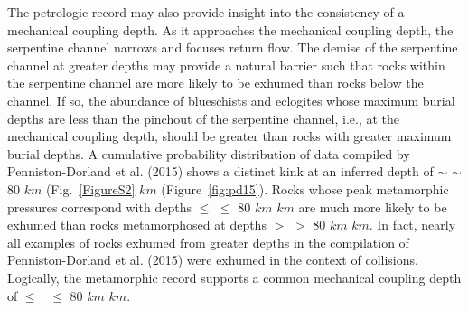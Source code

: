 \documentclass[draft,linenumbers]{agujournal2018} %
\providecommand{\DIFaddtex}[1]{{\protect\color{blue} \sf #1}} %
\providecommand{\DIFdeltex}[1]{{\protect\color{red} \scriptsize #1}} %
\providecommand{\DIFaddbegin}{} %
\providecommand{\DIFaddend}{} %
\providecommand{\DIFdelbegin}{} %
\providecommand{\DIFdelend}{} %
\providecommand{\DIFadd}[1]{\texorpdfstring{\DIFaddtex{#1}}{#1}} %
\providecommand{\DIFdel}[1]{\texorpdfstring{\DIFdeltex{#1}}{}} %
\newcommand{\DIFscaledelfig}{0.3}
\newlength{\DIFdelgraphicswidth} %
\newlength{\DIFdelgraphicsheight} %
\newcommand{\DIFaddincludegraphics}[2][]{{\color{blue}\fbox{\DIFOincludegraphics[#1]{#2}}}} %
\newcommand{\DIFdelincludegraphics}[2][]{%
\sbox{\DIFdelgraphicsbox}{\DIFOincludegraphics[#1]{#2}}%
\settoboxwidth{\DIFdelgraphicswidth}{\DIFdelgraphicsbox} %
\settoboxtotalheight{\DIFdelgraphicsheight}{\DIFdelgraphicsbox} %
\scalebox{\DIFscaledelfig}{%
\parbox[b]{\DIFdelgraphicswidth}{\usebox{\DIFdelgraphicsbox}\\[-\baselineskip] \rule{\DIFdelgraphicswidth}{0em}}\llap{\resizebox{\DIFdelgraphicswidth}{\DIFdelgraphicsheight}{%
\setlength{\unitlength}{\DIFdelgraphicswidth}%
\begin{picture}(1,1)%
\thicklines\linethickness{2pt} %
{\color[rgb]{1,0,0}\put(0,0){\framebox(1,1){}}}%
{\color[rgb]{1,0,0}\put(0,0){\line( 1,1){1}}}%
{\color[rgb]{1,0,0}\put(0,1){\line(1,-1){1}}}%
\end{picture}%
}\hspace*{3pt}}} %
} %
\DeclareRobustCommand{\DIFaddbegin}{\DIFOaddbegin \let\includegraphics\DIFaddincludegraphics} %
\DeclareRobustCommand{\DIFaddend}{\DIFOaddend \let\includegraphics\DIFOincludegraphics} %
\DeclareRobustCommand{\DIFdelbegin}{\DIFOdelbegin \let\includegraphics\DIFdelincludegraphics} %
\DeclareRobustCommand{\DIFdelend}{\DIFOaddend \let\includegraphics\DIFOincludegraphics} %
\begin{document}
The petrologic record may also provide insight into the consistency of a
mechanical coupling depth. As it approaches the mechanical coupling
depth, the serpentine channel narrows and focuses return flow. The
demise of the serpentine channel at greater depths may provide a natural
barrier such that rocks within the serpentine channel are more likely to
be exhumed than rocks below the channel. If so, the abundance of
blueschists and eclogites whose maximum burial depths are less than the
pinchout of the serpentine channel, i.e., at the mechanical coupling
depth, should be greater than rocks with greater maximum burial depths.
A cumulative probability distribution of data compiled by
\DIFdelbegin %
\DIFdelend \DIFaddbegin \DIFadd{Penniston-Dorland et al. (2015) }\DIFaddend shows a distinct kink at an inferred
depth of \DIFdelbegin \DIFdel{$\sim$}\DIFdelend \DIFaddbegin \DIFadd{\(\sim\) }\DIFaddend 80 \DIFdelbegin \DIFdel{$km$ (Fig.~\ref{FigureS2}}\DIFdelend \DIFaddbegin \DIFadd{\(km\) (Figure~\ref{fig:pd15}}\DIFaddend ). Rocks whose peak
metamorphic pressures correspond with depths \DIFdelbegin \DIFdel{$\leq$ }\DIFdelend \DIFaddbegin \DIFadd{\(\leq\) }\DIFaddend 80 \DIFdelbegin \DIFdel{$km$ }\DIFdelend \DIFaddbegin \DIFadd{\(km\) }\DIFaddend are much
more likely to be exhumed than rocks metamorphosed at depths \DIFdelbegin \DIFdel{$>$ }\DIFdelend \DIFaddbegin \DIFadd{\(>\) }\DIFaddend 80
\DIFdelbegin \DIFdel{$km$}\DIFdelend \DIFaddbegin \DIFadd{\(km\)}\DIFaddend . In fact, nearly all examples of rocks exhumed from greater
depths in the compilation of \DIFdelbegin %
\DIFdelend \DIFaddbegin \DIFadd{Penniston-Dorland et al. (2015) }\DIFaddend were
exhumed in the context of collisions. Logically, the metamorphic record
supports a common mechanical coupling depth of \DIFdelbegin \DIFdel{$\leq$~}\DIFdelend \DIFaddbegin \DIFadd{\(\leq\) }\DIFaddend 80 \DIFdelbegin \DIFdel{$km$}\DIFdelend \DIFaddbegin \DIFadd{\(km\)}\DIFaddend .
\end{document}
